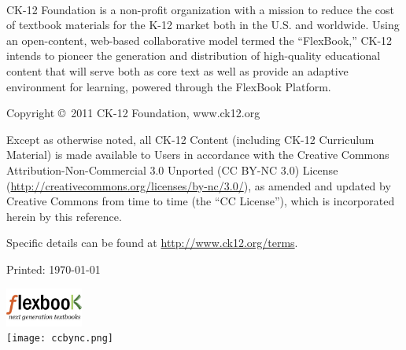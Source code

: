 \documentclass[xetex,11pt,twoside,openany]{book}
\begin{document}
{
  \setlength{\parindent}{0pt}
  \setlength{\parskip}{\baselineskip}
\begin{sloppypar}
  \\
  CK-12 Foundation is a non-profit organization with a mission to reduce the cost
  of textbook materials for the K-12 market both in the U.S. and worldwide.
  Using an open-content, web-based collaborative model termed the “FlexBook,”
  CK-12 intends to pioneer the generation and distribution of high-quality
  educational content that will serve both as core text as well as provide an
  adaptive environment for learning, powered through the FlexBook Platform\texttrademark.

  Copyright \copyright\  2011 CK-12 Foundation, www.ck12.org

  Except as otherwise noted, all CK-12 Content (including CK-12 Curriculum
  Material) is made available to Users in accordance with the Creative
  Commons Attribution-Non-Commercial 3.0 Unported (CC BY-NC 3.0)
  License (\url{http://creativecommons.org/licenses/by-nc/3.0/}), as
  amended and updated by Creative Commons from time to time (the ``CC License''),
  which is incorporated herein by this reference.

  Specific details can be found at \url{http://www.ck12.org/terms}.
  \end{sloppypar}

  Printed: \today

  \includegraphics[width=1in]{flexbooks.jpg}\\
  \texttt{[image: ccbync.png]}
}
\frontmatter{}

\thispagestyle{plain}
\twoside
{
\begin{center}
~\vfill
  \Large{}
  \normalsize{}
  \Large{} 
  \normalsize{} 
  \Large{} 
  \normalsize{} 
  \Large{} 
  \normalsize{} 
  \Large{} 
  \normalsize{} 
\vfill
\end{center}
}
\twoside
\newpage

\pagestyle{plain}
\setcounter{tocdepth}{1}
\tableofcontents
\mainmatter{}
\setcounter{page}{1}
\setcounter{chapter}{0}

\end{document}
